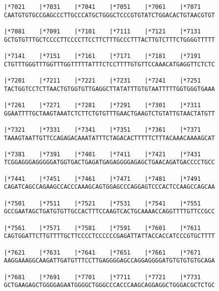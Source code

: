 \documentclass{article}
\begin{document}
\begin{Verbatim}
|*7021    |*7031    |*7041    |*7051    |*7061    |*7071    
CAATGTGTGCCGAGCCCTTGCCCATGCTGGGCTCCCGTGTATCTGGACACTGTAACGTGT
                                                            
|*7081    |*7091    |*7101    |*7111    |*7121    |*7131    
GCTGTGTTTGCTCCCCTTCCCCTTCCTTCTTTGCCCTTTACTTGTCTTTCTGGGGTTTTT
                                                            
|*7141    |*7151    |*7161    |*7171    |*7181    |*7191    
CTGTTTGGGTTTGGTTTGGTTTTTATTTCTCCTTTTGTGTTCCAAACATGAGGTTCTCTC
                                                            
|*7201    |*7211    |*7221    |*7231    |*7241    |*7251    
TACTGGTCCTCTTAACTGTGGTGTTGAGGCTTATATTTGTGTAATTTTTGGTGGGTGAAA
                                                            
|*7261    |*7271    |*7281    |*7291    |*7301    |*7311    
GGAATTTTGCTAAGTAAATCTCTTCTGTGTTTGAACTGAAGTCTGTATTGTAACTATGTT
                                                            
|*7321    |*7331    |*7341    |*7351    |*7361    |*7371    
TAAAGTAATTGTTCCAGAGACAAATATTTCTAGACACTTTTTCTTTACAAACAAAAGCAT
                                                            
|*7381    |*7391    |*7401    |*7411    |*7421    |*7431    
TCGGAGGGAGGGGGATGGTGACTGAGATGAGAGGGGAGAGCTGAACAGATGACCCCTGCC
                                                            
|*7441    |*7451    |*7461    |*7471    |*7481    |*7491    
CAGATCAGCCAGAAGCCACCCAAAGCAGTGGAGCCCAGGAGTCCCACTCCAAGCCAGCAA
                                                            
|*7501    |*7511    |*7521    |*7531    |*7541    |*7551    
GCCGAATAGCTGATGTGTTGCCACTTTCCAAGTCACTGCAAAACCAGGTTTTGTTCCGCC
                                                            
|*7561    |*7571    |*7581    |*7591    |*7601    |*7611    
CAGTGGATTCTTGTTTTGCTTCCCCTCCCCCCGAGATTATTACCACCATCCCGTGCTTTT
                                                            
|*7621    |*7631    |*7641    |*7651    |*7661    |*7671    
AAGGAAAGGCAAGATTGATGTTTCCTTGAGGGGAGCCAGGAGGGGATGTGTGTGTGCAGA
                                                            
|*7681    |*7691    |*7701    |*7711    |*7721    |*7731    
GCTGAAGAGCTGGGGAGAATGGGGCTGGGCCCACCCAAGCAGGAGGCTGGGACGCTCTGC
                                                            

\end{Verbatim}
\end{document}
